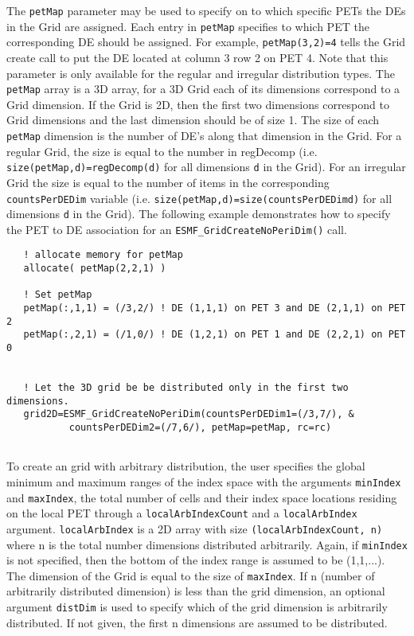   
   \begin{sloppypar}
   The {\tt petMap} parameter may be used to specify on to which specific PETs
   the DEs in the Grid are assigned. Each entry in {\tt petMap} specifies to which PET the corresponding
   DE should be assigned. For example, {\tt petMap(3,2)=4} tells the Grid
   create call to put the DE located at column 3 row 2 on PET 4.
   Note that this parameter is only available for the
   regular and irregular distribution types. The {\tt petMap}
   array is a 3D array, for a 3D Grid each of its dimensions correspond to a
   Grid dimension. If the Grid is 2D, then the first two dimensions correspond
   to Grid dimensions and the last dimension should be of size 1.
   The size of each {\tt petMap} dimension is
   the number of DE's along that dimension in the Grid. For a
   regular Grid, the size is equal to the number in regDecomp
   (i.e. {\tt size(petMap,d)=regDecomp(d)} for all dimensions {\tt d} in the Grid). For
   an irregular Grid the size is equal to the number of items in
   the corresponding {\tt countsPerDEDim} variable (i.e.
   {\tt size(petMap,d)=size(countsPerDEDimd)} for all dimensions {\tt d} in the Grid).
   The following example demonstrates how to specify the PET to DE association
   for an {\tt ESMF\_GridCreateNoPeriDim()} call.
   \end{sloppypar}
   

 \begin{verbatim}
   ! allocate memory for petMap
   allocate( petMap(2,2,1) )

   ! Set petMap
   petMap(:,1,1) = (/3,2/) ! DE (1,1,1) on PET 3 and DE (2,1,1) on PET 2
   petMap(:,2,1) = (/1,0/) ! DE (1,2,1) on PET 1 and DE (2,2,1) on PET 0


   ! Let the 3D grid be be distributed only in the first two dimensions.
   grid2D=ESMF_GridCreateNoPeriDim(countsPerDEDim1=(/3,7/), &
           countsPerDEDim2=(/7,6/), petMap=petMap, rc=rc)
 
\end{verbatim}
 

   To create an grid with arbitrary distribution, the user specifies the global minimum and maximum
   ranges of the index space with the
   arguments {\tt minIndex} and {\tt maxIndex}, the total number of cells and their index space locations
   residing on the local PET through a {\tt localArbIndexCount} and a {\tt localArbIndex}
   argument. {\tt localArbIndex} is a 2D array with size {\tt (localArbIndexCount, n)} where n is the total number
   dimensions distributed arbitrarily.
   Again, if {\tt minIndex} is  not specified, then the bottom of the
   index range is assumed to be (1,1,...).
   The dimension of the Grid is equal to the size of {\tt maxIndex}.
   If n (number of arbitrarily distributed dimension) is less than the grid dimension, an optional
   argument {\tt distDim} is used to specify which of the grid dimension is arbitrarily distributed.
   If not given, the first n dimensions are assumed to be distributed.
  
